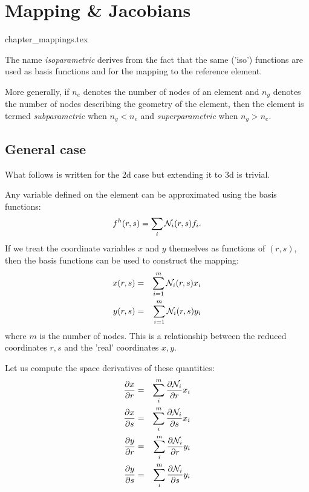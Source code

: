 \chapter{Mapping \& Jacobians} \label{ss:mappings} %

\begin{flushright} {\tiny {\color{gray} chapter\_mappings.tex}} \end{flushright}


The name {\sl isoparametric} derives from the fact that the same ('iso') 
functions are used as basis functions and for the mapping to the reference element.

More generally, if $n_e$ denotes the number of nodes of an element and $n_g$ denotes the 
number of nodes describing the geometry of the element, 
then the element is termed {\sl subparametric} when $n_g<n_e$ and 
{\sl superparametric} when $n_g>n_e$.

\section{General case}

What follows is written for the 2d case but extending it to 3d is trivial.

Any variable defined on the element can be approximated using the basis functions:
\begin{equation}
f^h(r,s)=\sum_i {\mathcal{N}}_i(r,s) f_i.
\end{equation}
If we treat the coordinate variables $x$ and $y$ themselves as functions of $(r,s)$, 
then the basis functions can be used to construct the mapping:
\begin{eqnarray}
x(r,s) &=& \sum_{i=1}^m {\mathcal{N}}_i(r,s) x_i \\
y(r,s) &=& \sum_{i=1}^m {\mathcal{N}}_i(r,s) y_i 
\end{eqnarray}
where $m$ is the number of nodes.
This is a relationship between the reduced coordinates $r,s$ and the 'real'
coordinates $x,y$.

Let us compute the space derivatives of these quantities:
\begin{eqnarray}
\frac{\partial x}{\partial r} &=& \sum_i^m \frac{\partial {\mathcal{N}}_i}{\partial r} x_i \label{eq:dddd1}\\
\frac{\partial x}{\partial s} &=& \sum_i^m \frac{\partial {\mathcal{N}}_i}{\partial s} x_i \label{eq:dddd2}\\
\frac{\partial y}{\partial r} &=& \sum_i^m \frac{\partial {\mathcal{N}}_i}{\partial r} y_i \label{eq:dddd3}\\
\frac{\partial y}{\partial s} &=& \sum_i^m \frac{\partial {\mathcal{N}}_i}{\partial s} y_i \label{eq:dddd4}
\end{eqnarray}

